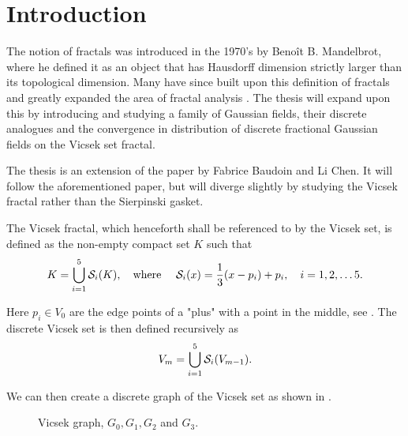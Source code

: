 \setlength\beforechapskip{-1em}
\chapter{Introduction}


The notion of fractals was introduced in the 1970's by Benoît B. Mandelbrot, where he defined it as an object that has Hausdorff dimension strictly larger than its topological dimension. Many have since built upon this definition of fractals and  greatly expanded the area of fractal analysis \cite{Falconer_1985, barlow, Kigami_2001, specAnal}. The thesis will expand upon this by introducing and studying a family of Gaussian fields, their discrete analogues and the convergence in distribution of discrete fractional Gaussian fields on the Vicsek set fractal.  

The thesis is an extension of the paper \cite{Fabrice} by Fabrice Baudoin and Li Chen. It will follow the aforementioned paper, but will diverge slightly by studying the Vicsek fractal rather than the Sierpinski gasket. 

\bigskip
\noi The Vicsek fractal, which henceforth shall be referenced to by the Vicsek set, is defined as the non-empty compact set $K$ such that
\begin{equation}
	K = \bigcup_{i = 1}^{5} \mathcal{S}_i(K), \quad \text{where } \quad \mathcal{S}_i(x) = \frac{1}{3}(x-p_i) + p_i, \quad i = 1,2,\ldots 5.
\end{equation}


Here $p_i \in V_0$ are the edge points of a "plus" with a point in the middle, see . The discrete Vicsek set is then defined recursively as
\begin{equation}
	V_m = \bigcup_{i = 1}^{5} \mathcal{S}_i(V_{m-1}).
\end{equation}


We can then create a discrete graph of the Vicsek set as shown in .

\def\vecScale{0.13}
\def\vecDist{0.5em}
\begin{figure}[!ht]
	\begin{center}
		
		\hspace{\vecDist}
		
		\hspace{\vecDist}
		
		\hspace{\vecDist}
		
	\end{center}
	\caption{Vicsek graph, $G_0, G_1, G_2$ and $G_3$.}
	\label{fig:vicsekGraphDiagram}
\end{figure}


